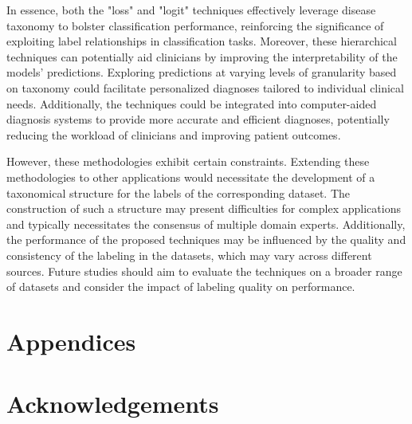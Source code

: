 In essence, both the "loss" and "logit" techniques effectively leverage disease taxonomy to bolster classification performance, reinforcing the significance of exploiting label relationships in classification tasks. Moreover, these hierarchical techniques can potentially aid clinicians by improving the interpretability of the models' predictions. Exploring predictions at varying levels of granularity based on taxonomy could facilitate personalized diagnoses tailored to individual clinical needs.  Additionally, the techniques could be integrated into computer-aided diagnosis systems to provide more accurate and efficient diagnoses, potentially reducing the workload of clinicians and improving patient outcomes.

However, these methodologies exhibit certain constraints. Extending these methodologies to other applications would necessitate the development of a taxonomical structure for the labels of the corresponding dataset. The construction of such a structure may present difficulties for complex applications and typically necessitates the consensus of multiple domain experts. Additionally, the performance of the proposed techniques may be influenced by the quality and consistency of the labeling in the datasets, which may vary across different sources. Future studies should aim to evaluate the techniques on a broader range of datasets and consider the impact of labeling quality on performance.


\section*{Appendices}
\section*{Acknowledgements}

